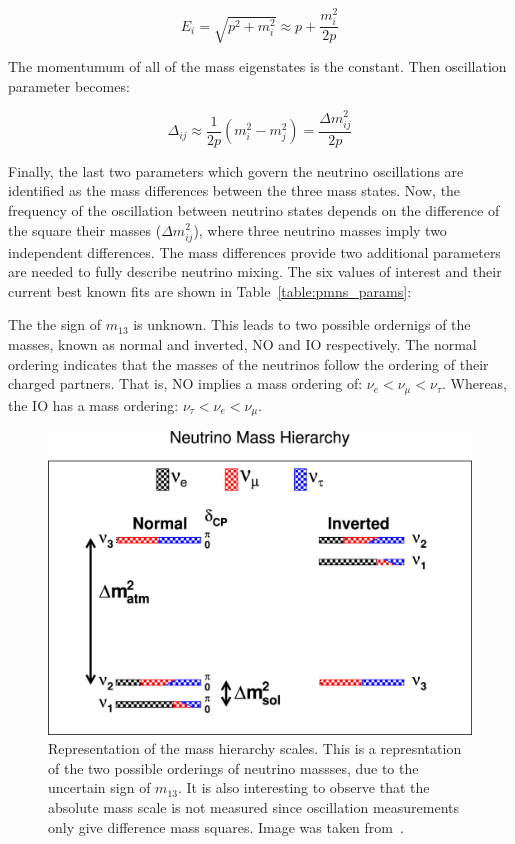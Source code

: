 \begin{equation}
E_{i} = \sqrt{p^2 + m_{i}^{2}} \approx p + \frac{m^{2}_{i}}{2p}
\end{equation}

The momentumum of all of the mass eigenstates is the constant.
Then oscillation parameter becomes:

\begin{equation}
\Delta_{ij} \approx \frac{1}{2p}(m^2_{i}-m^{2}_{j}) = \frac{\Delta m_{ij}^2}{2p}
\end{equation}

Finally, the last two parameters which govern the neutrino oscillations are identified as the mass differences between the three mass states.
Now, the frequency of the oscillation between neutrino states depends on the difference of the square their masses ($\Delta m_{ij}^{2}$), where three neutrino masses imply two independent differences.
The mass differences provide two additional parameters are needed to fully describe neutrino mixing.
The six values of interest and their current best known fits are shown in Table~\ref{table:pmns_params}:

The the sign of $m_{13}$ is unknown.
This leads to two possible ordernigs of the masses, known as normal and inverted, NO and IO respectively.
The normal ordering indicates that the masses of the neutrinos follow the ordering of their charged partners.
That is, NO implies a mass ordering of: $\nu_{e} < \nu_{\mu} < \nu_{\tau}$.
Whereas, the IO has a mass ordering: $\nu_{\tau} < \nu_{e} < \nu_{\mu}$.

\begin{figure}[]
\centering
\includegraphics[width=\textwidth]{images/mass_hierarchy.jpg}
\caption{Representation of the mass hierarchy scales. This is a represntation of the two possible orderings of neutrino massses, due to the uncertain sign of $m_{13}$. It is also interesting to observe that the absolute mass scale is not measured since oscillation measurements only give difference mass squares. Image was taken from~\citep{QIAN20151}.}
\end{figure}~\label{fig:mass_hierarchy}

